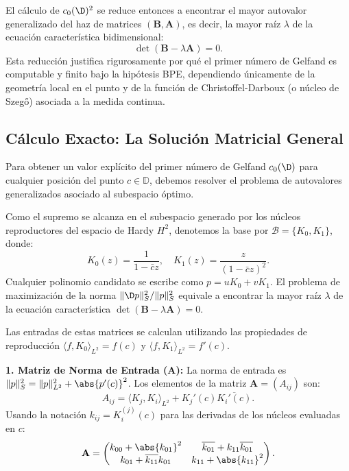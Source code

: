 El cálculo de $c_0(\D)^2$ se reduce entonces a encontrar el mayor autovalor generalizado del haz de matrices $(\mathbf{B}, \mathbf{A})$, es decir, la mayor raíz $\lambda$ de la ecuación característica bidimensional:
\begin{equation}
	\det(\mathbf{B} - \lambda \mathbf{A}) = 0.
\end{equation}
Esta reducción justifica rigurosamente por qué el primer número de Gelfand es computable y finito bajo la hipótesis BPE, dependiendo únicamente de la geometría local en el punto y de la función de Christoffel-Darboux (o núcleo de Szegő) asociada a la medida continua.


\subsection{Cálculo Exacto: La Solución Matricial General}

Para obtener un valor explícito del primer número de Gelfand $c_0(\D)$ para cualquier posición del punto $c \in \mathbb{D}$, debemos resolver el problema de autovalores generalizados asociado al subespacio óptimo.

Como el supremo se alcanza en el subespacio generado por los núcleos reproductores del espacio de Hardy $H^2$, denotemos la base por $\mathcal{B} = \{K_0, K_1\}$, donde:
\begin{equation}
	K_0(z) = \frac{1}{1-\bar{c}z}, \quad K_1(z) = \frac{z}{(1-\bar{c}z)^2}.
\end{equation}
Cualquier polinomio candidato se escribe como $p = u K_0 + v K_1$. El problema de maximización de la norma $\|\D p\|_S^2 / \|p\|_S^2$ equivale a encontrar la mayor raíz $\lambda$ de la ecuación característica $\det(\mathbf{B} - \lambda \mathbf{A}) = 0$.

Las entradas de estas matrices se calculan utilizando las propiedades de reproducción $\langle f, K_0 \rangle_{L^2} = f(c)$ y $\langle f, K_1 \rangle_{L^2} = f'(c)$.

\textbf{1. Matriz de Norma de Entrada ($\mathbf{A}$):}
La norma de entrada es $\|p\|_S^2 = \|p\|_{L^2}^2 + \abs{p'(c)}^2$. Los elementos de la matriz $\mathbf{A} = (A_{ij})$ son:
\[ A_{ij} = \langle K_j, K_i \rangle_{L^2} + K_j'(c)\overline{K_i'(c)}. \]
Usando la notación $k_{ij} = K_i^{(j)}(c)$ para las derivadas de los núcleos evaluadas en $c$:
\begin{equation}
	\mathbf{A} = \begin{pmatrix}
		k_{00} + \abs{k_{01}}^2          & \overline{k_{01}} + k_{11}\overline{k_{01}} \\
		k_{01} + \overline{k_{11}}k_{01} & k_{11} + \abs{k_{11}}^2
	\end{pmatrix}.
\end{equation}

